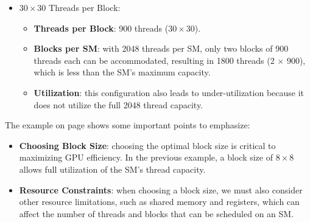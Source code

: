 \begin{examplebox}
\begin{itemize}
        \item $30 \times 30$ Threads per Block:
        \begin{itemize}
            \item \textbf{Threads per Block}: 900 threads ($30 \times 30$).
            \item \textbf{Blocks per SM}: with 2048 threads per SM, only two blocks of 900 threads each can be accommodated, resulting in 1800 threads (2 $\times$ 900), which is less than the SM's maximum capacity.
            \item \textbf{Utilization}: this configuration also leads to under-utilization because it does not utilize the full 2048 thread capacity.
        \end{itemize}
    \end{itemize}
\end{examplebox}

\newpage

The example on page \pageref{examplebox: Matrix Multiplication on Volta Architecture} shows some important points to emphasize:
\begin{itemize}
    \item \textbf{Choosing Block Size}: choosing the optimal block size is critical to maximizing GPU efficiency. In the previous example, a block size of $8 \times 8$ allows full utilization of the SM's thread capacity.
    \item \textbf{Resource Constraints}: when choosing a block size, we must also consider other resource limitations, such as shared memory and registers, which can affect the number of threads and blocks that can be scheduled on an SM.
\end{itemize}
